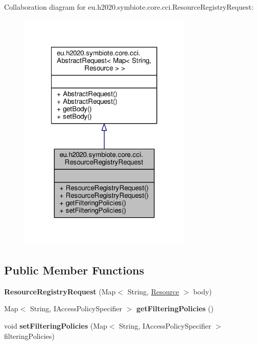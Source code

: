 Collaboration diagram for eu.\+h2020.\+symbiote.\+core.\+cci.\+Resource\+Registry\+Request\+:\nopagebreak
\begin{figure}[H]
\begin{center}
\leavevmode
\includegraphics[width=234pt]{classeu_1_1h2020_1_1symbiote_1_1core_1_1cci_1_1ResourceRegistryRequest__coll__graph}
\end{center}
\end{figure}
\subsection*{Public Member Functions}
\begin{DoxyCompactItemize}
\item 
\mbox{\label{classeu_1_1h2020_1_1symbiote_1_1core_1_1cci_1_1ResourceRegistryRequest_a77f60130fd33e9940346c0b1f28eaa61}} 
{\bfseries Resource\+Registry\+Request} (Map$<$ String, \hyperlink{classeu_1_1h2020_1_1symbiote_1_1model_1_1cim_1_1Resource}{Resource} $>$ body)
\item 
\mbox{\label{classeu_1_1h2020_1_1symbiote_1_1core_1_1cci_1_1ResourceRegistryRequest_af6087e76901839f050933bc130c50366}} 
Map$<$ String, I\+Access\+Policy\+Specifier $>$ {\bfseries get\+Filtering\+Policies} ()
\item 
\mbox{\label{classeu_1_1h2020_1_1symbiote_1_1core_1_1cci_1_1ResourceRegistryRequest_a562fe2d50205a4922d7fedc2752ac67b}} 
void {\bfseries set\+Filtering\+Policies} (Map$<$ String, I\+Access\+Policy\+Specifier $>$ filtering\+Policies)
\end{DoxyCompactItemize}


